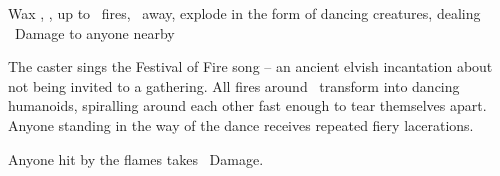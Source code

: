   {\mFire}%
  {Wax}%
  {\detailed, \duplicated, \distant}%
  {}%
  {up to \spellArea\ fires, \spellRange\ away, explode in the form of dancing creatures, dealing \rollConv\ Damage to anyone nearby}%
  {
    The caster sings the Festival of Fire song -- an ancient elvish incantation about not being invited to a gathering.
    All fires around \spellRange\ transform into dancing humanoids, spiralling around each other fast enough to tear themselves apart.
    Anyone standing in the way of the dance receives repeated fiery lacerations.

    Anyone hit by the flames takes \rollConv\ Damage.
  }

